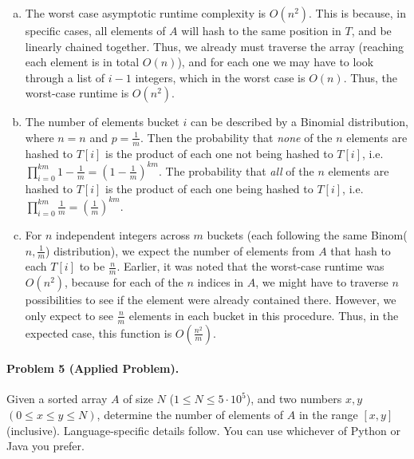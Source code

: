 \documentclass[11pt]{article}
\begin{document}
\begin{enumerate}[(a)]
    	\item The worst case asymptotic runtime complexity is $O(n^2)$. This is
            because, in specific cases, all elements of $A$ will hash to the 
            same position in $T$, and be linearly chained together. Thus, we
            already must traverse the array (reaching each element is in total
            $O(n)$), and for each one we may have to look through a list of 
            $i - 1$ integers, which in the worst case is $O(n)$. Thus, the 
            worst-case runtime is $O(n^2)$. 
	\item The number of elements bucket $i$ can be described by a Binomial
            distribution, where $n = n$ and $p = \frac{1}{m}$. Then the
            probability that \textit{none} of the $n$ elements are hashed to
            $T[i]$ is the product of each one not being hashed to $T[i]$, i.e.
            $\prod_{i = 0}^{km} 1 - \frac{1}{m} = (1 - \frac{1}{m})^{km}$. The
            probability that \textit{all} of the $n$ elements are hashed to
            $T[i]$ is the product of each one being hashed to $T[i]$, i.e.
            $\prod_{i = 0}^{km} \frac{1}{m} = (\frac{1}{m})^{km}$.
	\item For $n$ independent integers across $m$ buckets (each following 
            the same Binom($n, \frac{1}{m}$) distribution), we expect the number
            of elements from $A$ that hash to each $T[i]$ to be $\frac{n}{m}$.
            Earlier, it was noted that the worst-case runtime was $O(n^2)$,
            because for each of the $n$ indices in $A$, we might have to
            traverse $n$ possibilities to see if the element were already
            contained there. However, we only expect to see $\frac{n}{m}$
            elements in each bucket in this procedure. Thus, in the expected
            case, this function is $O(\frac{n^2}{m})$.
\end{enumerate}



\newpage
\paragraph{Problem 5 (Applied Problem).}
Given a sorted array $A$ of size $N$ ($1 \leq N \leq 5\cdot10^{5}$), and two
numbers $x,y$ $(0 \leq x \leq y \leq N)$, determine the number of elements of 
$A$ in the range $[x,y]$ (inclusive). Language-specific details follow. You can
use whichever of Python or Java you prefer.
\end{document}

